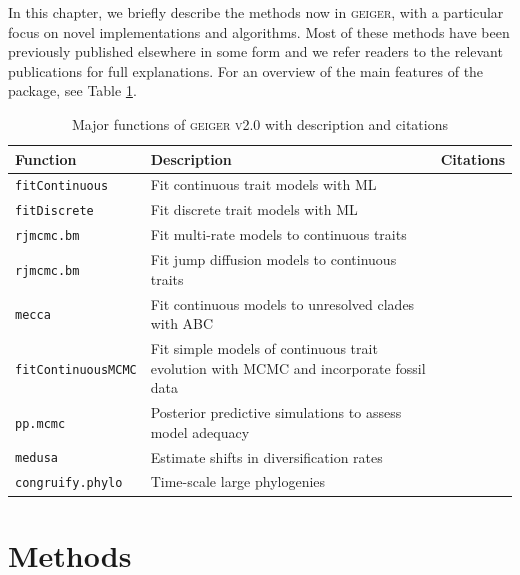 In this chapter, we briefly describe the methods now in \textsc{geiger}, with a particular focus on novel implementations and algorithms. Most of these methods have been previously published elsewhere in some form and we refer readers to the relevant publications for full explanations. For an overview of the main features of the package, see Table \ref{tab:geiger-fxns}.

\begin{table}
\centering
  \begin{tabular}{| p{3.5cm} | p{5.5cm} | p{4cm} |}
    \hline
    Function & Description & Citations \\ \hline
    \texttt{fitContinuous} & Fit continuous trait models with ML & \citet{Felsenstein1973, Hansen1997, Pagel1997, Pagel1999, Blomberg2003, Hunt2006, Harmon2010, FitzJohn2012} \\ \hline
    \texttt{fitDiscrete} & Fit discrete trait models with ML & \citet{Pagel1994, Lewis2001, FitzJohn2009} \\ \hline
    \texttt{rjmcmc.bm} & Fit multi-rate models to continuous traits & \citet{Eastman2011} \\ \hline
    \texttt{rjmcmc.bm} & Fit jump diffusion models to continuous traits & \citet{Eastmanjump} \\ \hline
    \texttt{mecca} & Fit continuous models to unresolved clades with ABC & \citet{Slater2012MECCA} \\ \hline
     \texttt{fitContinuousMCMC} & Fit simple models of continuous trait evolution with MCMC and incorporate fossil data & \citet{Slater2012Fossil} \\ \hline
     \texttt{pp.mcmc} & Posterior predictive simulations to assess model adequacy & \citet{SlaterPennell} \\ \hline
    \texttt{medusa} & Estimate shifts in diversification rates & \citet{Alfaro2009} \\ \hline
     \texttt{congruify.phylo} & Time-scale large phylogenies & \citet{Eastman2013} \\ \hline
  \end{tabular}
\caption[Major features of \textsc{geiger v2.0}]{Major functions of \textsc{geiger v2.0} with description and citations}
\label{tab:geiger-fxns}
\end{table}



\section{Methods}
